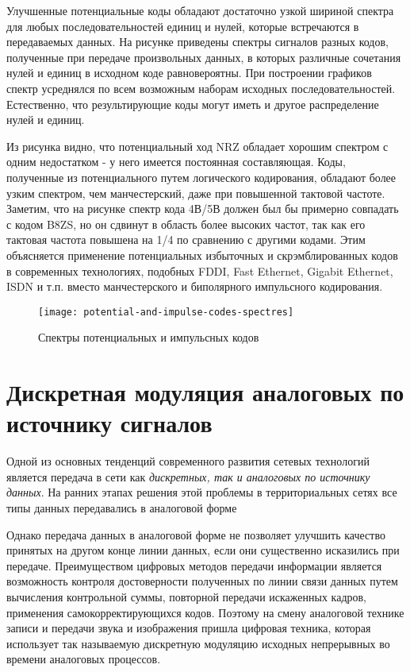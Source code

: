 Улучшенные потенциальные коды обладают достаточно узкой шириной спектра для любых последовательностей единиц и нулей, которые встречаются в передаваемых данных.
На рисунке приведены спектры сигналов разных кодов, полученные при передаче произвольных данных, в которых различные сочетания нулей и единиц в исходном коде равновероятны.
При построении графиков спектр усреднялся по всем возможным наборам исходных последовательностей.
Естественно, что результирующие коды могут иметь и другое распределение нулей и единиц.

Из рисунка видно, что потенциальный ход NRZ обладает хорошим спектром с одним недостатком - у него имеется постоянная составляющая.
Коды, полученные из потенциального путем логического кодирования, обладают более узким спектром, чем манчестерский, даже при повышенной тактовой частоте.
Заметим, что на рисунке спектр кода 4В/5В должен был бы примерно совпадать с кодом B8ZS, но он сдвинут в область более высоких частот, так как его тактовая частота повышена на 1/4 по сравнению с другими кодами.
Этим объясняется применение потенциальных избыточных и скрэмблированных кодов в современных технологиях, подобных FDDI, Fast Ethernet, Gigabit Ethernet, ISDN и т.п.
вместо манчестерского и биполярного импульсного кодирования.

\begin{figure}
    \centering
    \texttt{[image: potential-and-impulse-codes-spectres]}
    \caption{Спектры потенциальных и импульсных кодов}
    \label{fig:potential-and-impulse-codes-spectres}
\end{figure}

\section{Дискретная модуляция аналоговых по источнику сигналов}

Одной из основных тенденций современного развития сетевых технологий является передача в сети как \emph{дискретных, так и аналоговых по источнику данных}.
На ранних этапах решения этой проблемы в территориальных сетях все типы данных передавались в аналоговой форме

Однако передача данных в аналоговой форме не позволяет улучшить качество принятых на другом конце линии данных, если они существенно исказились при передаче.
Преимуществом цифровых методов передачи информации является возможность контроля достоверности полученных по линии связи данных путем вычисления контрольной суммы, повторной передачи искаженных кадров, применения самокорректирующихся кодов.
Поэтому на смену аналоговой технике записи и передачи звука и изображения пришла цифровая техника, которая использует так называемую дискретную модуляцию исходных непрерывных во времени аналоговых процессов.

